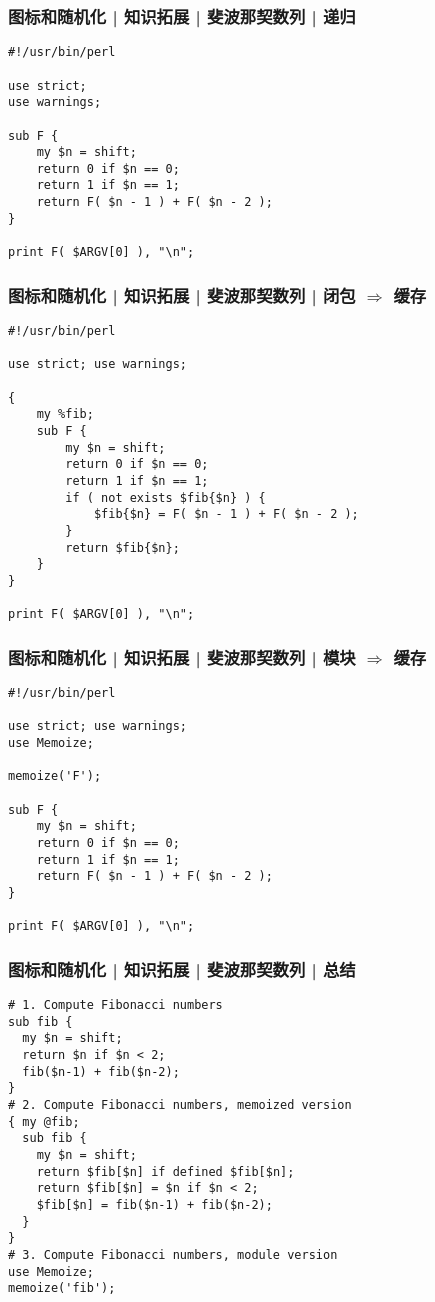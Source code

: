 \begin{frame}[fragile]
  \frametitle{图标和随机化 | 知识拓展 | 斐波那契数列 | 递归}
\begin{lstlisting}
#!/usr/bin/perl

use strict;
use warnings;

sub F {
    my $n = shift;
    return 0 if $n == 0;
    return 1 if $n == 1;
    return F( $n - 1 ) + F( $n - 2 );
}

print F( $ARGV[0] ), "\n";
\end{lstlisting}
\end{frame}

\begin{frame}[fragile]
  \frametitle{图标和随机化 | 知识拓展 | 斐波那契数列 | \alert{闭包 $\Rightarrow$ 缓存}}
\begin{lstlisting}[basicstyle=\small\tt]
#!/usr/bin/perl

use strict; use warnings;

{
    my %fib;
    sub F {
        my $n = shift;
        return 0 if $n == 0;
        return 1 if $n == 1;
        if ( not exists $fib{$n} ) {
            $fib{$n} = F( $n - 1 ) + F( $n - 2 );
        }
        return $fib{$n};
    }
}

print F( $ARGV[0] ), "\n";
\end{lstlisting}
\end{frame}

\begin{frame}[fragile]
  \frametitle{图标和随机化 | 知识拓展 | 斐波那契数列 | 模块 $\Rightarrow$ 缓存}
\begin{lstlisting}
#!/usr/bin/perl

use strict; use warnings;
use Memoize;

memoize('F');

sub F {
    my $n = shift;
    return 0 if $n == 0;
    return 1 if $n == 1;
    return F( $n - 1 ) + F( $n - 2 );
}

print F( $ARGV[0] ), "\n";
\end{lstlisting}
\end{frame}

\begin{frame}[fragile]
  \frametitle{图标和随机化 | 知识拓展 | 斐波那契数列 | 总结}
  \begin{lstlisting}[basicstyle=\small\tt]
# 1. Compute Fibonacci numbers
sub fib {
  my $n = shift;
  return $n if $n < 2;
  fib($n-1) + fib($n-2);
}
# 2. Compute Fibonacci numbers, memoized version
{ my @fib;
  sub fib {
    my $n = shift;
    return $fib[$n] if defined $fib[$n];
    return $fib[$n] = $n if $n < 2;
    $fib[$n] = fib($n-1) + fib($n-2);
  }
}
# 3. Compute Fibonacci numbers, module version
use Memoize;
memoize('fib');
\end{lstlisting}
\end{frame}


